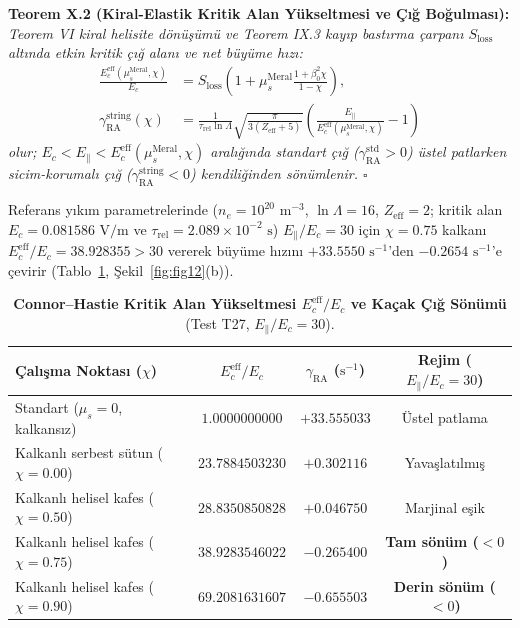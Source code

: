 \documentclass[12pt,a4paper]{article}
\begin{document}
\textbf{Teorem X.2 (Kiral-Elastik Kritik Alan Yükseltmesi ve Çığ Boğulması):} \textit{Teorem VI kiral helisite dönüşümü ve Teorem IX.3 kayıp bastırma çarpanı $S_{\mathrm{loss}}$ altında etkin kritik çığ alanı ve net büyüme hızı:}
\begin{equation}
\begin{split}
\frac{E_c^{\mathrm{eff}}(\mu_s^{\mathrm{Meral}},\chi)}{E_c}
&= S_{\mathrm{loss}}\left(1 + \mu_s^{\mathrm{Meral}}\frac{1+\beta_0^2\chi}{1-\chi}\right), \\
\gamma_{\mathrm{RA}}^{\mathrm{string}}(\chi)
&= \frac{1}{\tau_{\mathrm{rel}}\ln\Lambda}\sqrt{\frac{\pi}{3(Z_{\mathrm{eff}}+5)}}
\left(\frac{E_\parallel}{E_c^{\mathrm{eff}}(\mu_s^{\mathrm{Meral}},\chi)} - 1\right)
\end{split}
\label{eq:t27_ec}
\end{equation}
\textit{olur; $E_c < E_\parallel < E_c^{\mathrm{eff}}(\mu_s^{\mathrm{Meral}},\chi)$ aralığında standart çığ ($\gamma_{\mathrm{RA}}^{\mathrm{std}} > 0$) üstel patlarken sicim-korumalı çığ ($\gamma_{\mathrm{RA}}^{\mathrm{string}} < 0$) kendiliğinden sönümlenir. $\square$}

Referans yıkım parametrelerinde ($n_e=10^{20}\text{ m}^{-3}$, $\ln\Lambda=16$, $Z_{\mathrm{eff}}=2$; kritik alan $E_c=0.081586\text{ V/m}$ ve $\tau_{\mathrm{rel}}=2.089\times 10^{-2}\text{ s}$) $E_\parallel/E_c = 30$ için $\chi=0.75$ kalkanı $E_c^{\mathrm{eff}}/E_c = 38.928355 > 30$ vererek büyüme hızını $+33.5550\text{ s}^{-1}$'den $-0.2654\text{ s}^{-1}$'e çevirir (Tablo~\ref{tab:t27}, Şekil~\ref{fig:fig12}(b)).

\begin{table}[!htbp]
\centering
\footnotesize
\setlength{\tabcolsep}{2pt}
\caption{\textbf{Connor--Hastie Kritik Alan Yükseltmesi $E_c^{\mathrm{eff}}/E_c$ ve Kaçak Çığ Sönümü} (Test T27, $E_\parallel/E_c=30$).}
\label{tab:t27}
\vspace{0.1cm}
\begin{tabular}{@{}l|c|c|c@{}}
\hline
\textbf{Çalışma Noktası ($\chi$)} & \textbf{$E_c^{\mathrm{eff}}/E_c$} & \textbf{$\gamma_{\mathrm{RA}}$ ($\text{s}^{-1}$)} & \textbf{Rejim ($E_\parallel/E_c=30$)} \\
\hline
Standart ($\mu_s = 0$, kalkansız) & $1.0000000000$ & $+33.555033$ & Üstel patlama \\
Kalkanlı serbest sütun ($\chi = 0.00$) & $23.7884503230$ & $+0.302116$ & Yavaşlatılmış \\
Kalkanlı helisel kafes ($\chi = 0.50$) & $28.8350850828$ & $+0.046750$ & Marjinal eşik \\
Kalkanlı helisel kafes ($\chi = 0.75$) & $38.9283546022$ & $-0.265400$ & \textbf{Tam sönüm ($<0$)} \\
Kalkanlı helisel kafes ($\chi = 0.90$) & $69.2081631607$ & $-0.655503$ & \textbf{Derin sönüm ($<0$)} \\
\hline
\end{tabular}
\end{table}
\end{document}
